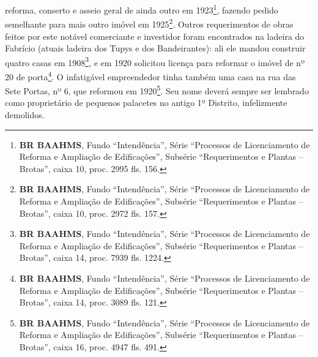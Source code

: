 reforma, conserto e asseio geral de ainda outro em 1923\footnote{\textbf{BR BAAHMS}, Fundo ``Intendência'', Série ``Processos de Licenciamento de Reforma e Ampliação de Edificações'', Subsérie ``Requerimentos e Plantas -- Brotas'', caixa 10, proc. 2995 fls. 156.}, fazendo pedido semelhante para mais outro imóvel em 1925\footnote{\textbf{BR BAAHMS}, Fundo ``Intendência'', Série ``Processos de Licenciamento de Reforma e Ampliação de Edificações'', Subsérie ``Requerimentos e Plantas -- Brotas'', caixa 10, proc. 2972 fls. 157.}. Outros requerimentos de obras feitos por este notável comerciante e investidor foram encontrados na ladeira do Fabrício (atuais ladeira dos Tupys e dos Bandeirantes): ali ele mandou construir quatro casas em 1908\footnote{\textbf{BR BAAHMS}, Fundo ``Intendência'', Série ``Processos de Licenciamento de Reforma e Ampliação de Edificações'', Subsérie ``Requerimentos e Plantas -- Brotas'', caixa 14, proc. 7939 fls. 1224.}, e em 1920 solicitou licença para reformar o imóvel de nº 20 de porta\footnote{\textbf{BR BAAHMS}, Fundo ``Intendência'', Série ``Processos de Licenciamento de Reforma e Ampliação de Edificações'', Subsérie ``Requerimentos e Plantas -- Brotas'', caixa 14, proc. 3089 fls. 121.}. O infatigável empreendedor tinha também uma casa na rua das Sete Portas, nº 6, que reformou em 1920\footnote{\textbf{BR BAAHMS}, Fundo ``Intendência'', Série ``Processos de Licenciamento de Reforma e Ampliação de Edificações'', Subsérie ``Requerimentos e Plantas -- Brotas'', caixa 16, proc. 4947 fls. 491.}. Seu nome deverá sempre ser lembrado como proprietário de pequenos palacetes no antigo 1º Distrito, infelizmente demolidos.


